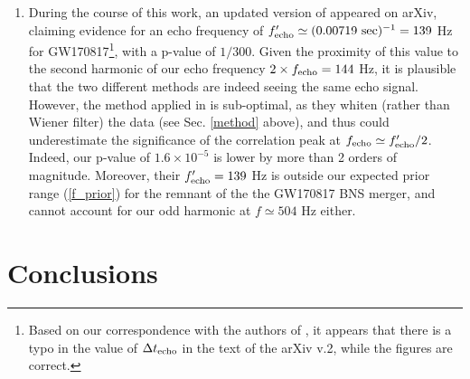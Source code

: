 \documentclass[12pt]{article}
\begin{document}
\begin{enumerate}

\item During the course of this work, an updated version of \cite{Conklin:2017lwb} appeared on arXiv, claiming evidence for an echo frequency of $f'_{\rm echo} \simeq (0.00719 ~{\rm sec}) ^{-1}= 139$ Hz for GW170817\footnote{Based on our correspondence with the authors of \cite{Conklin:2017lwb}, it appears that there is a typo in the value of $\Delta t_{\rm echo}$ in the text of the arXiv v.2, while the figures are correct.}, with a p-value of $1/300$. Given the proximity of this value to the second harmonic of our echo frequency $2\times f_{\rm echo} = 144$ Hz, it is plausible that the two different methods are indeed seeing the same echo signal. However, the method applied in  \cite{Conklin:2017lwb} is sub-optimal, as they whiten (rather than Wiener filter) the data (see Sec. \ref{method} above), and thus could underestimate the significance of the correlation peak at $f_{\rm echo} \simeq f'_{\rm echo}/2$. Indeed, our p-value of  $1.6 \times 10^{-5}$ is lower by more than 2 orders of magnitude. Moreover, their $f'_{\rm echo} = 139$ Hz is outside our expected prior range (\ref{f_prior}) for the remnant of the the GW170817 BNS merger, and cannot account for our odd harmonic at $f \simeq 504$ Hz either.  

\end{enumerate}
\section{\label{conclude}Conclusions}
\end{document}
